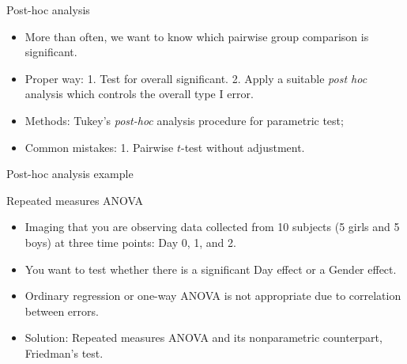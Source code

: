 \begin{frame}{Post-hoc analysis}
  \begin{itemize}
  \item More than often, we want to know which pairwise group
    comparison is significant.
  \item Proper way: 1. Test for overall significant. 2. Apply a
    suitable \textit{post hoc} analysis which controls the overall
    type I error.
  \item Methods: Tukey's \textit{post-hoc} analysis procedure for parametric test; 
  \item Common mistakes: 1. Pairwise $t$-test without adjustment.
  \end{itemize}
\end{frame}

\begin{frame}[fragile]{Post-hoc analysis example}

\begin{knitrout}\footnotesize
{}\color{fgcolor}\begin{kframe}
\begin{alltt}
\hlstd{(} \hlopt{~} 

\hlstd{(}\hlstd{)}
 \hlstd{=}\hlstd{)}
\end{alltt}
\end{kframe}
\end{knitrout}
\end{frame}

\begin{frame}{Repeated measures ANOVA}
  \begin{itemize}
  \item Imaging that you are observing data collected from 10 subjects
    (5 girls and 5 boys) at three time points: Day 0, 1, and 2.
  \item You want to test whether there is a significant Day effect or
    a Gender effect.
  \item Ordinary regression or one-way ANOVA is not appropriate due to
    correlation between errors.
  \item Solution: Repeated measures ANOVA and its nonparametric
    counterpart, Friedman's test.
  \end{itemize}
\end{frame}

